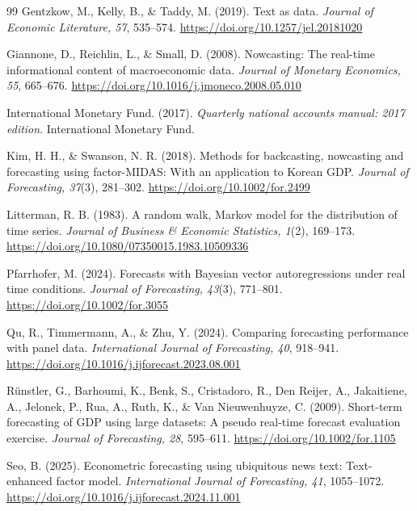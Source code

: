 \documentclass[preprint,12pt,authoryear]{elsarticle}
\begin{document}
\begin{thebibliography}{99}
Gentzkow, M., Kelly, B., \& Taddy, M. (2019). Text as data. \emph{Journal of
Economic Literature, 57}, 535--574.
\url{https://doi.org/10.1257/jel.20181020}

Giannone, D., Reichlin, L., \& Small, D. (2008). Nowcasting: The real-time
informational content of macroeconomic data. \emph{Journal of Monetary
Economics, 55}, 665--676.
\url{https://doi.org/10.1016/j.jmoneco.2008.05.010}

International Monetary Fund. (2017). \emph{Quarterly national accounts manual: 2017 edition}. International Monetary Fund.

Kim, H. H., \& Swanson, N. R. (2018). Methods for backcasting, nowcasting and forecasting using factor-MIDAS: With an application to Korean GDP.
\emph{Journal of Forecasting, 37}(3), 281--302.
\url{https://doi.org/10.1002/for.2499}

Litterman, R. B. (1983). A random walk, Markov model for the distribution of time series.
\emph{Journal of Business \& Economic Statistics, 1}(2), 169--173.
\url{https://doi.org/10.1080/07350015.1983.10509336}

Pfarrhofer, M. (2024). Forecasts with Bayesian vector autoregressions under real time conditions.
\emph{Journal of Forecasting, 43}(3), 771--801.
\url{https://doi.org/10.1002/for.3055}

Qu, R., Timmermann, A., \& Zhu, Y. (2024). Comparing forecasting performance
with panel data. \emph{International Journal of Forecasting, 40}, 918--941.
\url{https://doi.org/10.1016/j.ijforecast.2023.08.001}

R{\"u}nstler, G., Barhoumi, K., Benk, S., Cristadoro, R., Den Reijer, A.,
Jakaitiene, A., Jelonek, P., Rua, A., Ruth, K., \& Van Nieuwenhuyze, C. (2009).
Short-term forecasting of GDP using large datasets: A pseudo real-time forecast
evaluation exercise. \emph{Journal of Forecasting, 28}, 595--611.
\url{https://doi.org/10.1002/for.1105}

Seo, B. (2025). Econometric forecasting using ubiquitous news text:
Text-enhanced factor model. \emph{International Journal of Forecasting, 41},
1055--1072. \url{https://doi.org/10.1016/j.ijforecast.2024.11.001}


\end{thebibliography}
\end{document}
